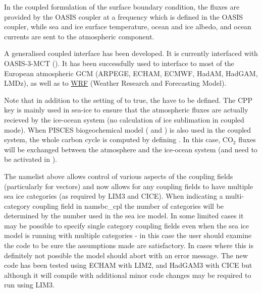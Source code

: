 \documentclass[../tex_main/NEMO_manual]{subfiles}
\begin{document}

In the coupled formulation of the surface boundary condition, the fluxes are 
provided by the OASIS coupler at a frequency which is defined in the OASIS coupler, 
while sea and ice surface temperature, ocean and ice albedo, and ocean currents 
are sent to the atmospheric component.

A generalised coupled interface has been developed. 
It is currently interfaced with OASIS-3-MCT (). 
It has been successfully used to interface \NEMO to most of the European atmospheric 
GCM (ARPEGE, ECHAM, ECMWF, HadAM, HadGAM, LMDz), 
as well as to \href{http://wrf-model.org/}{WRF} (Weather Research and Forecasting Model).

Note that in addition to the setting of  to true, the  have to be defined. 
The CPP key is mainly used in sea-ice to ensure that the atmospheric fluxes are 
actually recieved by the ice-ocean system (no calculation of ice sublimation in coupled mode).
When PISCES biogeochemical model ( and ) is also used in the coupled system, 
the whole carbon cycle is computed by defining . In this case, 
CO$_2$ fluxes will be exchanged between the atmosphere and the ice-ocean system (and need to be activated in  ).

The namelist above allows control of various aspects of the coupling fields (particularly for
vectors) and now allows for any coupling fields to have multiple sea ice categories (as required by LIM3
and CICE).  When indicating a multi-category coupling field in namsbc{\_}cpl the number of categories will be
determined by the number used in the sea ice model.  In some limited cases it may be possible to specify 
single category coupling fields even when the sea ice model is running with multiple categories - in this
case the user should examine the code to be sure the assumptions made are satisfactory.  In cases where
this is definitely not possible the model should abort with an error message.  The new code has been tested using
ECHAM with LIM2, and HadGAM3 with CICE but although it will compile with  additional minor code changes
may be required to run using LIM3.


\end{document}
